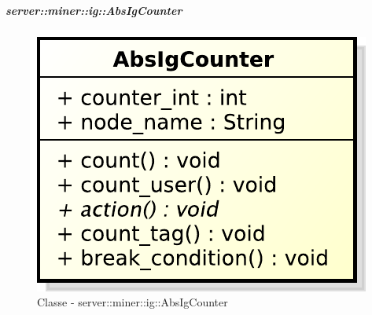 	\subparagraph{server::miner::ig::AbsIgCounter} %
		\label{subp:server_miner_ig_AbsIgCounter}
		    \begin{figure}[!htbp]
 		 		\centering
 				\centerline{\includegraphics[scale=0.75]{./images/server/classes/miner/abs_ig_counter.pdf}}
 				\caption{Classe - server::miner::ig::AbsIgCounter}
			\end{figure}
